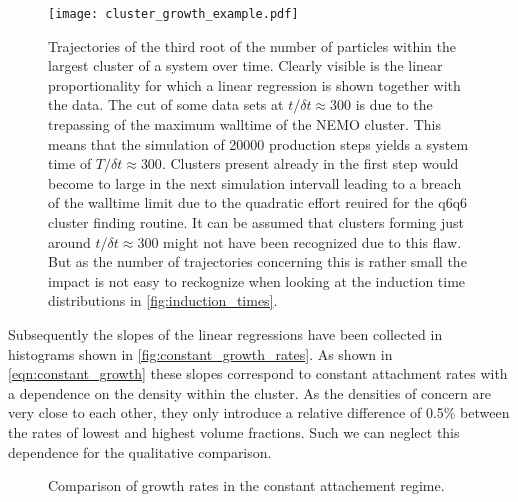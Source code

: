 \begin{figure}[h]
\label{fig:cluster_growth_example}
\centering
\texttt{[image: cluster\_growth\_example.pdf]}
\caption{Trajectories of the third root of the number of particles within the largest cluster of a system over time. Clearly visible is the linear proportionality for which a linear regression is shown together with the data. The cut of some data sets at $t/\delta t \approx 300$ is due to the trepassing of the maximum walltime of the NEMO cluster. This means that the simulation of 20000 production steps yields a system time of $T/\delta t \approx 300$. Clusters present already in the first step would become to large in the next simulation intervall leading to a breach of the walltime limit due to the quadratic effort reuired for the q6q6 cluster finding routine. It can be assumed that clusters forming just around $t/\delta t \approx 300$ might not have been recognized due to this flaw. But as the number of trajectories concerning this is rather small the impact is not easy to reckognize when looking at the induction time distributions in \autoref{fig:induction_times}.}
\label{fig:cluster_growth_example}
\end{figure}

Subsequently the slopes of the linear regressions have been collected in histograms shown in \autoref{fig:constant_growth_rates}. As shown in \autoref{eqn:constant_growth} these slopes correspond to constant attachment rates with a dependence on the density within the cluster. As the densities of concern are very close to each other, they only introduce a relative difference of 0.5\% between the rates of lowest and highest volume fractions. Such we can neglect this dependence for the qualitative comparison.\\ 

\begin{figure}[h]
\begin{center}
 \hspace{0.5cm}
\caption{Comparison of growth rates in the constant attachement regime.}
\label{fig:constant_growth_rates}
\end{center}
\end{figure}

